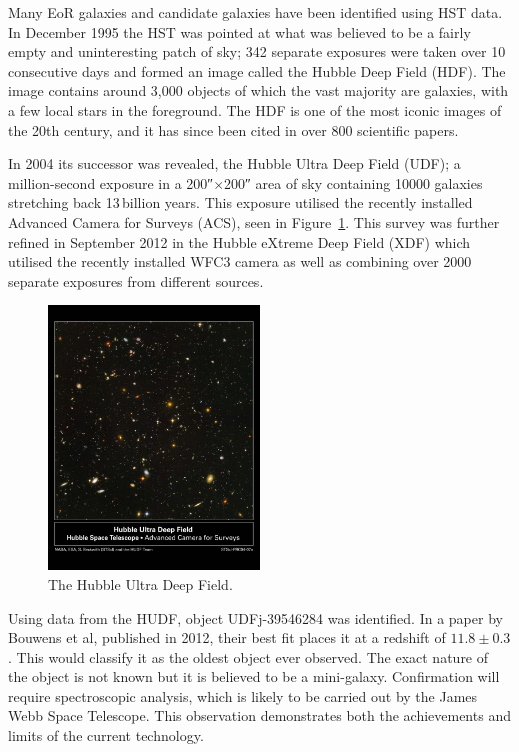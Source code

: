 		Many EoR galaxies and candidate galaxies have been identified using HST data. In December 1995 the HST was pointed at what was believed to be a fairly empty and uninteresting patch of sky; 342 separate exposures were taken over 10 consecutive days and formed an image called the Hubble Deep Field (HDF)\cite{ESA_2}. The image contains around 3,000 objects of which the vast majority are galaxies, with a few local stars in the foreground. The HDF is one of the most iconic images of the 20th century, and it has since been cited in over 800 scientific papers.

		In 2004 its successor was revealed, the Hubble Ultra Deep Field (UDF); a million-second exposure in a 200\si{\arcsecond}$\times$200\si{\arcsecond} area of sky containing \num{10000} galaxies stretching back 13\,billion years\cite{Hubsite_2}. This exposure utilised the recently installed Advanced Camera for Surveys (ACS), seen in Figure~\ref{fig:HUDF}. This survey was further refined in September 2012 in the Hubble eXtreme Deep Field (XDF) which utilised the recently installed WFC3 camera as well as combining over \num{2000} separate exposures from different sources\cite{ESA_2}.
		\begin{figure}[!htbp]
			\centering
			\includegraphics[trim = 10mm 80mm 10mm 35mm, clip, width=0.5\textwidth]{../Images/HUDF.png}
			\caption{The Hubble Ultra Deep Field. \label{fig:HUDF}}
		\end{figure}

		Using data from the HUDF, object UDFj-39546284 was identified. In a paper by Bouwens et al, published in 2012, their best fit places it at a redshift of $11.8\pm0.3$\cite{Bouwens2012}. This would classify it as the oldest object ever observed. The exact nature of the object is not known but it is believed to be a mini-galaxy. Confirmation will require spectroscopic analysis, which is likely to be carried out by the James Webb Space Telescope. This observation demonstrates both the achievements and limits of the current technology.

